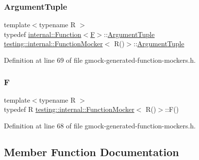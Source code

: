 \subsubsection{\texorpdfstring{Argument\+Tuple}{ArgumentTuple}}
{\footnotesize\ttfamily template$<$typename R $>$ \\
typedef \hyperlink{structtesting_1_1internal_1_1Function}{internal\+::\+Function}$<$\hyperlink{classtesting_1_1internal_1_1FunctionMocker_3_01R_07_08_4_a2c1d7da413176d87405227df90a95521}{F}$>$\+::\hyperlink{classtesting_1_1internal_1_1FunctionMocker_3_01R_07_08_4_a5a279e0d8414bf0809405c06a0725b66}{Argument\+Tuple} \hyperlink{classtesting_1_1internal_1_1FunctionMocker}{testing\+::internal\+::\+Function\+Mocker}$<$ R()$>$\+::\hyperlink{classtesting_1_1internal_1_1FunctionMocker_3_01R_07_08_4_a5a279e0d8414bf0809405c06a0725b66}{Argument\+Tuple}}



Definition at line 69 of file gmock-\/generated-\/function-\/mockers.\+h.

\mbox{\label{classtesting_1_1internal_1_1FunctionMocker_3_01R_07_08_4_a2c1d7da413176d87405227df90a95521}} 
\subsubsection{\texorpdfstring{F}{F}}
{\footnotesize\ttfamily template$<$typename R $>$ \\
typedef R \hyperlink{classtesting_1_1internal_1_1FunctionMocker}{testing\+::internal\+::\+Function\+Mocker}$<$ R()$>$\+::F()}



Definition at line 68 of file gmock-\/generated-\/function-\/mockers.\+h.



\subsection{Member Function Documentation}
\mbox{\label{classtesting_1_1internal_1_1FunctionMocker_3_01R_07_08_4_a8096a10aea2ffc6a78d0437855d2ef10}} 
